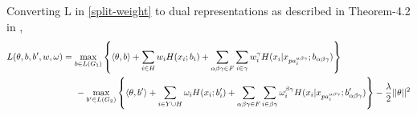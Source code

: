 \documentclass{article}
\begin{document}
Converting L in \ref{split-weight} to dual representations as described in Theorem-4.2 in \cite{Ping2015},
\begin{align}
L(\theta,b,b',w,\omega)&= \max_{b\in L(G_1)}  \left\{ \langle \theta,b \rangle+\sum_{i\in H}w_iH(x_i;b_i)+\sum_{\alpha\beta\gamma\in F}\sum_{i\in \gamma}w_i^{\gamma}H(x_i|x_{pa_i^{\alpha\beta\gamma}};b_{\alpha\beta\gamma}) \right \} \nonumber \\\label{dual}&\hspace{5mm}- \max_{b'\in L(G_2)}  \left\{ \langle \theta,b' \rangle+\sum_{i\in Y\cup H}\omega_iH(x_i;b'_i)+\sum_{\alpha\beta\gamma\in F}\sum_{i\in \beta\gamma}\omega_i^{\beta\gamma}H(x_i|x_{pa_i^{\alpha\beta\gamma}};b'_{\alpha\beta\gamma})  \right\} - \frac{\lambda}{2}||\theta||^2
\end{align}
\end{document}
